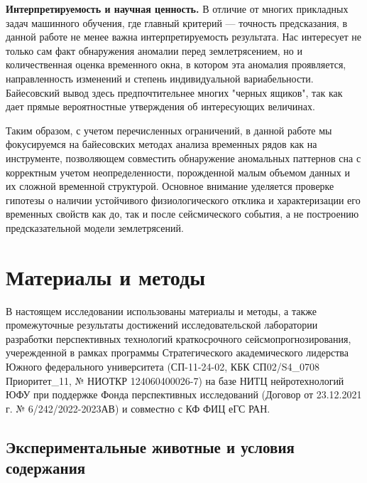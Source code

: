 \documentclass[14pt]{mmcs_article}
\begin{document}
\textbf{Интерпретируемость и научная ценность.} В отличие от многих прикладных задач машинного обучения, где главный критерий — точность предсказания, в данной работе не менее важна интерпретируемость результата. Нас интересует не только сам факт обнаружения аномалии перед землетрясением, но и количественная оценка временного окна, в котором эта аномалия проявляется, направленность изменений и степень индивидуальной вариабельности. Байесовский вывод здесь предпочтительнее многих "черных ящиков", так как дает прямые вероятностные утверждения об интересующих величинах.

Таким образом, с учетом перечисленных ограничений, в данной работе мы фокусируемся на байесовских методах анализа временных рядов как на инструменте, позволяющем совместить обнаружение аномальных паттернов сна с корректным учетом неопределенности, порожденной малым объемом данных и их сложной временной структурой. Основное внимание уделяется проверке гипотезы о наличии устойчивого физиологического отклика и характеризации его временных свойств как до, так и после сейсмического события, а не построению предсказательной модели землетрясений.



\newpage

\section{Материалы и методы}

В настоящем исследовании использованы материалы и методы, а также промежуточные результаты достижений исследовательской лаборатории разработки перспективных технологий краткосрочного сейсмопрогнозирования, учережденной в рамках программы Стратегического академического лидерства Южного федерального университета (СП-11-24-02, КБК СП02/S4\_0708 Приоритет\_11, № НИОТКР 124060400026-7) на базе НИТЦ нейротехнологий ЮФУ при поддержке Фонда перспективных исследований (Договор от 23.12.2021 г. № 6/242/2022-2023АВ) и совместно с КФ ФИЦ еГС РАН. 

\subsection*{Экспериментальные животные и условия содержания}
\end{document}
